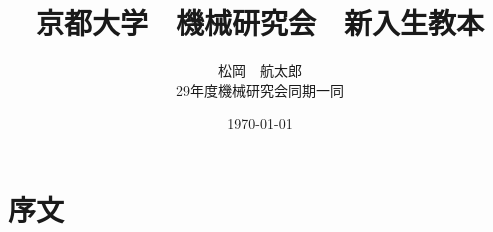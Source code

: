 \documentclass[a4paper,titlepage]{ujarticle}
\title{京都大学　機械研究会　新入生教本}
\date{\today}
\author{松岡　航太郎\\29年度機械研究会同期一同}
\begin{document}
\maketitle
\section{序文}
\end{document}
